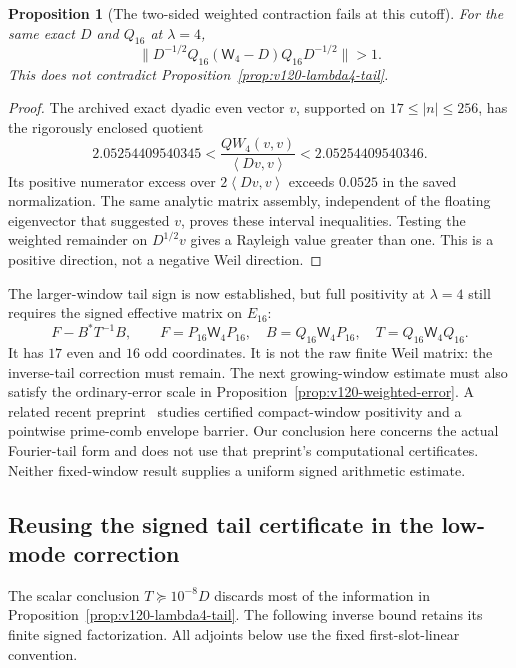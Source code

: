 \documentclass[11pt]{article}
\newtheorem{proposition}[theorem]{Proposition}
\theoremstyle{remark}
\newcommand{\ip}[2]{\left\langle #1,#2\right\rangle}
\begin{document}
\begin{proposition}[The two-sided weighted contraction fails at this cutoff]
\label{prop:v120-norm-counterexample}
For the same exact $D$ and $Q_{16}$ at $\lambda=4$,
\[
 \|D^{-1/2}Q_{16}(\mathsf W_4-D)Q_{16}D^{-1/2}\|>1.
\]
This does not contradict Proposition~\ref{prop:v120-lambda4-tail}.
\end{proposition}
\begin{proof}
The archived exact dyadic even vector $v$, supported on
$17\le|n|\le256$, has the rigorously enclosed quotient
\[
 2.05254409540345<\frac{QW_4(v,v)}{\ip{Dv}{v}}
                         <2.05254409540346.
\]
Its positive numerator excess over $2\ip{Dv}{v}$ exceeds
$0.0525$ in the saved normalization. The same analytic matrix
assembly, independent of the floating eigenvector that suggested
$v$, proves these interval inequalities. Testing the weighted
remainder on $D^{1/2}v$ gives a Rayleigh value greater than one.
This is a positive direction, not a negative Weil direction.
\end{proof}

The larger-window tail sign is now established, but full positivity
at $\lambda=4$ still requires the signed effective matrix on
$E_{16}$:
\[
 F-B^*T^{-1}B,\qquad
 F=P_{16}\mathsf W_4P_{16},\quad B=Q_{16}\mathsf W_4P_{16},
 \quad T=Q_{16}\mathsf W_4Q_{16}.
\]
It has $17$ even and $16$ odd coordinates. It is not the raw finite
Weil matrix: the inverse-tail correction must remain.
The next growing-window estimate must also satisfy the ordinary-error
scale in Proposition~\ref{prop:v120-weighted-error}.
A related recent preprint~\cite{Zhu2026Windows} studies certified
compact-window positivity and a pointwise prime-comb envelope barrier.
Our conclusion here concerns the actual Fourier-tail form and does
not use that preprint's computational certificates. Neither fixed-window
result supplies a uniform signed arithmetic estimate.

\subsection*{Reusing the signed tail certificate in the low-mode correction}
The scalar conclusion $T\succeq10^{-8}D$ discards most of the
information in Proposition~\ref{prop:v120-lambda4-tail}. The following
inverse bound retains its finite signed factorization. All adjoints
below use the fixed first-slot-linear convention.
\end{document}
